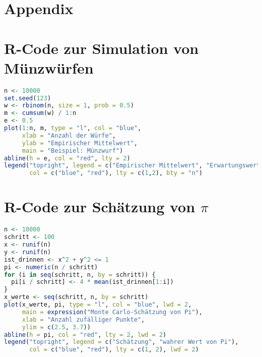 \documentclass[12pt,a4paper]{article}
\begin{document}
\newpage




\newpage

\appendix
\section{Appendix}

\section*{R-Code zur Simulation von Münzwürfen}

\begin{lstlisting}[language=R, caption={Simulation von Münzwürfen mit R}, label={lst:muenzenwurf}]
n <- 10000
set.seed(123)
w <- rbinom(n, size = 1, prob = 0.5)
m <- cumsum(w) / 1:n
e <- 0.5
plot(1:n, m, type = "l", col = "blue",
     xlab = "Anzahl der Würfe",
     ylab = "Empirischer Mittelwert",
     main = "Beispiel: Münzwurf")
abline(h = e, col = "red", lty = 2)
legend("topright", legend = c("Empirischer Mittelwert", "Erwartungswert (0.5)"),
       col = c("blue", "red"), lty = c(1,2), bty = "n")
\end{lstlisting}

\section*{R-Code zur Schätzung von \texorpdfstring{$\pi$}{π}}

\begin{lstlisting}[language=R, caption={Monte-Carlo-Schätzung von $\pi$ mit R}, label={lst:pi_montecarlo}]
n <- 10000
schritt <- 100
x <- runif(n)
y <- runif(n)
ist_drinnen <- x^2 + y^2 <= 1
pi <- numeric(n / schritt)
for (i in seq(schritt, n, by = schritt)) {
  pi[i / schritt] <- 4 * mean(ist_drinnen[1:i])
}
x_werte <- seq(schritt, n, by = schritt)
plot(x_werte, pi, type = "l", col = "blue", lwd = 2,
     main = expression("Monte Carlo-Schätzung von Pi"),
     xlab = "Anzahl zufälliger Punkte",
     ylim = c(2.5, 3.7))
abline(h = pi, col = "red", lty = 2, lwd = 2)
legend("topright", legend = c("Schätzung", "wahrer Wert von Pi"),
       col = c("blue", "red"), lty = c(1, 2), lwd = 2)
\end{lstlisting}
\end{document}
